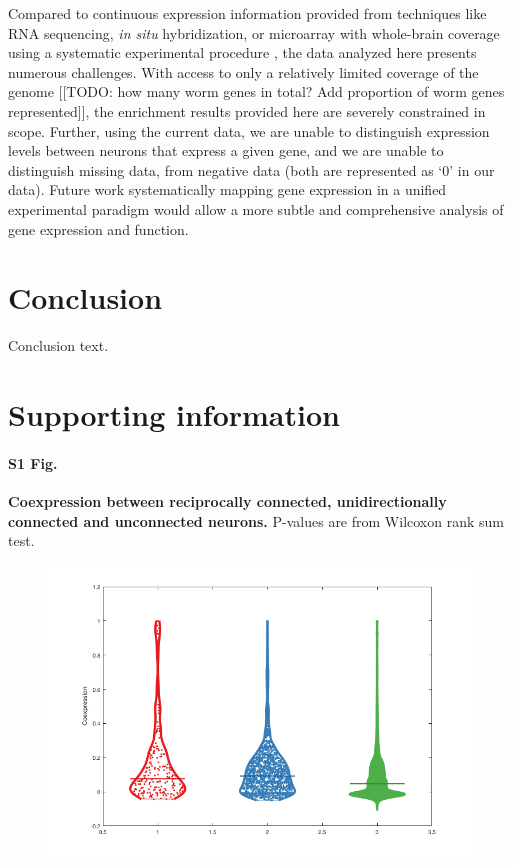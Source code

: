 \documentclass[10pt,letterpaper]{article}
\begin{document}
Compared to continuous expression information provided from techniques like RNA sequencing, \emph{in situ} hybridization, or microarray with whole-brain coverage using a systematic experimental procedure \cite{Lein:2007jn, Shen:2012ua, Tasic:2016jp}, the data analyzed here presents numerous challenges.
With access to only a relatively limited coverage of the genome [[TODO: how many worm genes in total? Add proportion of worm genes represented]], the enrichment results provided here are severely constrained in scope.
Further, using the current data, we are unable to distinguish expression levels between neurons that express a given gene, and we are unable to distinguish missing data, from negative data (both are represented as `0' in our data).
Future work systematically mapping gene expression in a unified experimental paradigm would allow a more subtle and comprehensive analysis of gene expression and function.

\section*{Conclusion}

Conclusion text.

\section*{Supporting information}

\paragraph*{S1 Fig.}
{\bf Coexpression between reciprocally connected, unidirectionally connected and unconnected neurons.} P-values are from Wilcoxon rank sum test.
\begin{figure}[!h]
\label{S1_Fig}
\centering
    \includegraphics[width=1\textwidth]{RecUnidirUncon}
\end{figure}
\end{document}
